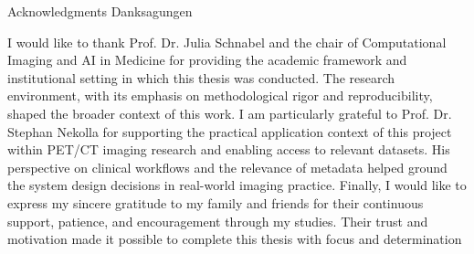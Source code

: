 \makeatletter
{}
{}
{}
\makeatother
\thispagestyle{empty}

\vspace*{20mm}

\begin{center}
\makeatletter
{}
{ Acknowledgments}
{ Danksagungen}
\makeatother
\end{center}

\vspace{10mm}

I would like to thank Prof. Dr. Julia Schnabel and the chair of Computational Imaging and AI in Medicine for providing the academic framework and institutional setting in which this thesis was conducted. The research environment, with its emphasis on methodological rigor and reproducibility, shaped the broader context of this work. I am particularly grateful to Prof. Dr. Stephan Nekolla for supporting the practical application context of this project within PET/CT imaging research and enabling access to relevant datasets. His perspective on clinical workflows and the relevance of metadata helped ground the system design decisions in real-world imaging practice. Finally, I would like to express my sincere gratitude to my family and friends for their continuous support, patience, and encouragement through my studies. Their trust and motivation made it possible to complete this thesis with focus and determination

\cleardoublepage{}
